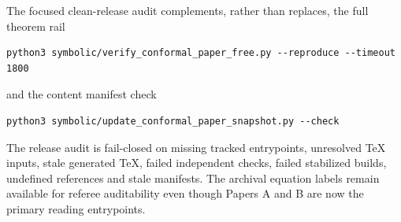 \documentclass[11pt]{article}
\begin{document}
The focused clean-release audit complements, rather than replaces, the full
theorem rail
\begin{verbatim}
python3 symbolic/verify_conformal_paper_free.py --reproduce --timeout 1800
\end{verbatim}
and the content manifest check
\begin{verbatim}
python3 symbolic/update_conformal_paper_snapshot.py --check
\end{verbatim}

The release audit is fail-closed on missing tracked entrypoints, unresolved
TeX inputs, stale generated TeX, failed independent checks, failed stabilized
builds, undefined references and stale manifests.  The archival equation
labels remain available for referee auditability even though Papers A and B
are now the primary reading entrypoints.
\end{document}
